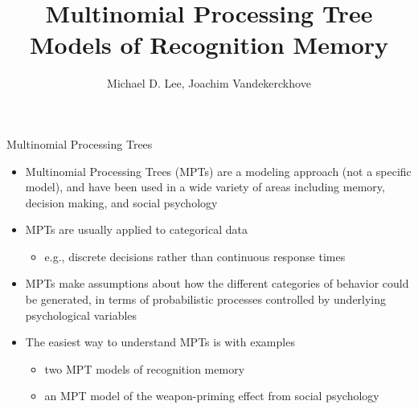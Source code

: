 \documentclass[10pt]{beamer}
\author[shortname]{Michael D. Lee, Joachim Vandekerckhove}
\title{Multinomial Processing Tree Models of Recognition Memory}
\begin{document}
\maketitle


\begin{frame}[fragile]{Multinomial Processing Trees}
	\begin{itemize}
		\item Multinomial Processing Trees (MPTs) are a modeling approach (not a specific model), and have been used in a wide variety of areas including memory, decision making, and social psychology \cite{BatchelderRiefer1980,erdfelder2009multinomial}
		\item MPTs are usually applied to categorical data
		      \begin{itemize}
			      \item e.g., discrete decisions rather than continuous response times
		      \end{itemize}
		\item MPTs make assumptions about how the different categories of behavior could be generated, in terms of probabilistic processes controlled by underlying psychological variables
		\item The easiest way to understand MPTs is with examples
		      \begin{itemize}
			      \item two MPT models of recognition memory
			      \item an MPT model of the weapon-priming effect from social psychology
		      \end{itemize}
	\end{itemize}
\end{frame}
\end{document}

